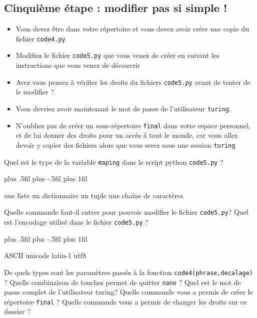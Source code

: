 \documentclass[a4paper,10pt,addpoints]{exam}
\newenvironment{oneparcheckboxescentering}{
	\begingroup
	\leftskip=80mm plus .5fil%
	\rightskip=0mm plus -.5fil%
	\parfillskip=0mm plus 1fil\relax
	\begin{oneparcheckboxes}
	}{
	\end{oneparcheckboxes}
	\par
	\endgroup
}
\begin{document}
\begin{questions}
\subsection{Cinquième étape : modifier pas si simple !  }
\begin{itemize}[label=$\leadsto$, font=\LARGE \color{blue}]
	\item Vous devez être dans votre répertoire et vous devez avoir créer une copie du fichier \verb|code4.py|
	\item Modifiez le fichier \verb|code5.py| que vous venez de créer en suivant les instructions que vous venez de découvrir
	\item Avez vous pensez à vérifier les droits du fichiers \verb|code5.py| avant de tenter de le modifier ?
	\item Vous devriez avoir maintenant le mot de passe de l'utilisateur \verb|turing|.
	\item N'oubliez pas de créer un sous-répertoire \verb|final| dans votre espace personnel, et de lui donner des droits pour un accès à tout le monde, car vous allez devoir y copier des fichiers alors que vous serez sous une session \verb|turing|
\end{itemize}
\question [1] Quel est le type de la variable \verb|maping| dans le script python \verb|code5.py| ?
\newline

\begin{oneparcheckboxescentering}
	 \choice une liste  \choice un dictionnaire \choice un tuple \choice une chaîne de caractères
\end{oneparcheckboxescentering}
\question [1] Quelle commande faut-il entrer pour pouvoir modifier le fichier \verb|code5.py|?
\answerline
\question [1] Quel est l'encodage utilisé dans le fichier \verb|code5.py| ?
\newline

\begin{oneparcheckboxescentering}
	\choice ASCII  \choice unicode \choice latin-1 \choice utf8
\end{oneparcheckboxescentering}
\question [1] De quels types sont les paramètres passés à la fonction \verb|code4(phrase,decalage)| ?
\answerline
\question [1] Quelle combinaison de touches permet de quitter \verb|nano| ?
\answerline
\question [1] Quel est le mot de passe complet de l'utilisateur turing?
\answerline
\question [1] Quelle commande vous a permis de créer le répertoire \verb|final| ?
\answerline
\question [1] Quelle commande vous a permis de changer les droits sur ce dossier ?
\answerline



\end{questions}
\end{document}
